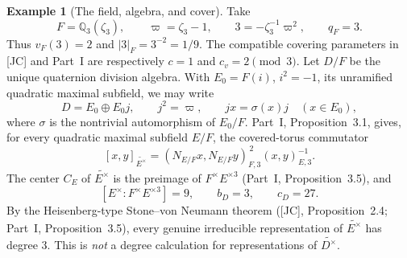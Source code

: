 \documentclass[11pt]{article}
\newcommand{\Q}{\mathbb Q}
\theoremstyle{plain}
\theoremstyle{definition}
\newtheorem{example}[theorem]{Example}
\begin{document}
\begin{example}[The field, algebra, and cover]\label{ex:ranktwo-data}
Take
\[
 F=\Q_3(\zeta_3),\qquad \varpi=\zeta_3-1,\qquad
 3=-\zeta_3^{-1}\varpi^2,\qquad q_F=3.
\]
Thus $v_F(3)=2$ and $|3|_F=3^{-2}=1/9$.  The compatible
covering parameters in [JC] and Part~I are respectively
$c=1$ and $c_v=2\pmod3$.  Let $D/F$ be the unique quaternion
division algebra.  With $E_0=F(i)$, $i^2=-1$, its unramified
quadratic maximal subfield, we may write
\[
 D=E_0\oplus E_0j,\qquad j^2=\varpi,\qquad
 jx=\sigma(x)j\quad(x\in E_0),
\]
where $\sigma$ is the nontrivial automorphism of $E_0/F$.
Part~I, Proposition~3.1, gives, for every quadratic maximal
subfield $E/F$, the covered-torus commutator
\begin{equation}\label{eq:ranktwo-comm}
 [x,y]_{\widetilde{E^\times}}=
 (N_{E/F}x,N_{E/F}y)_{F,3}^{\,2}
 (x,y)_{E,3}^{-1}.
\end{equation}
The center $C_E$ of $\widetilde{E^\times}$ is the preimage of
$F^\times E^{\times3}$ (Part~I, Proposition~3.5), and
\[
 [E^\times:F^\times E^{\times3}]=9,
 \qquad b_D=3,\qquad c_D=27.
\]
By the Heisenberg-type Stone--von Neumann theorem
([JC], Proposition~2.4; Part~I, Proposition~3.5), every genuine
irreducible representation of $\widetilde{E^\times}$ has degree $3$.
This is \emph{not} a degree calculation for representations of
$\widetilde{D^\times}$.
\end{example}
\end{document}
